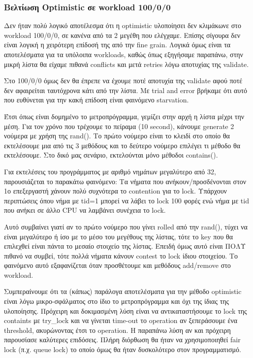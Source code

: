 \documentclass[../final_report.tex]{subfiles}
\begin{document}
\subsubsection{Βελτίωση Optimistic σε workload 100/0/0}

Δεν ήταν πολύ λογικό αποτέλεσμα ότι η optimistic υλοποίησει δεν κλιμάκωνε στο workload 100/0/0, σε κανένα από τα 2 μεγέθη που ελέγχαμε. Επίσης σίγουρα
δεν είναι λογική η χειρότερη επίδοσή της από την fine grain. Λογικά όμως είναι τα αποτελέσματα για τα υπόλοιπα workloads, καθώς όπως εξηγήσαμε παραπάνω, στην
μικρή λίστα θα είχαμε πιθανά conflicts και μετά retries λόγω αποτυχίας της validate.

Στο 100/0/0 όμως δεν θα έπρεπε να έχουμε ποτέ αποτυχία της validate αφού ποτέ δεν αφαιρείται ταυτόχρονα κάτι από την λίστα. Με trial and error βρήκαμε ότι
αυτό που ευθύνεται για την κακή επίδοση είναι φαινόμενο starvation. 

Έτσι όπως είναι δομημένο το μετροπρόγραμμα, γεμίζει στην αρχή η λίστα μέχρι την μέση. Για τον χρόνο που τρέχουμε το πείραμα (10 second), κάνουμε generate 2
νούμερα με χρήση της rand(). Το πρώτο νούμερο είναι το κλειδί στο οποίο θα εκτελέσουμε μια από τις 3 μεθόδους και το δεύτερο νούμερο επιλέγει τι μέθοδο θα εκτελέσουμε.
Στο δικό μας σενάριο, εκτελούνται μόνο μέθοδοι contains(). 

Για εκτελέσεις του προγράμματος με αριθμό νημάτων μεγαλύτερο από 32, παρουσιάζεται το παρακάτω φαινόμενο: Τα νήματα που ανήκουν/προσδένονται στον 1ο επεξεργαστή
χάνουν πολύ συχνότερα το contention για το lock. Υπάρχουν περιπτώσεις όπου νήμα με tid=1 μπορεί να λάβει το lock 100 φορές ενώ νήμα με tid που ανήκει σε άλλο CPU
να λαμβάνει συνέχεια το lock. 

Αυτό συμβαίνει γιατί αν το πρώτο νούμερο που γίνει rolled από την rand(), τύχει να είναι μεγαλύτερο ή ίσο με το μέσο του μεγέθους της λίστας, τότε το key που θα επιλεχθεί
είναι πάντα το μεσαίο στοιχείο της λίστας. Επειδή όμως αυτό είναι ΠΟΛΥ πιθανό να συμβεί, τότε πολλά νήματα κάνουν contest το lock ίδιου στοιχείου. Το φαινόμενο αυτό εξαφανίζεται
όταν προσθέτουμε και μεθόδους add/remove στο workload.

Συμπεραίνουμε ότι τα (κάπως) παράλογα αποτελέσματα για την μέθοδο optimistic είναι λόγω μικρο-σφάλματος στο ίδιο το μετροπρόγραμμα και όχι της ίδιας της υλοποίησης.
Πρόχειρη και δοκιμασμένη λύση είναι να αντικαταστήσουμε το lock της containts με try\_lock και να γίνεται time-out το operation αν ξεπεράσουμε ένα threshold, ακυρώνοντας έτσι
το operation. Η παραπάνω λύση αν και πρόχειρη παρουσίασε καλύτερες επιδόσεις. Πλήρη διόρθωση θα ήταν να χρησιμοποιηθεί fair lock (π.χ. queue lock) το οποίο όμως θα ήταν δυσκολότερο
στον προγραμματισμό.
\end{document}
